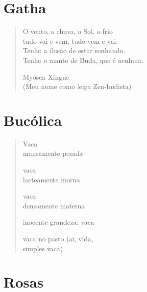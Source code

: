 \chapter{Gatha}

\begin{verse}
O vento, a chuva, o Sol, o frio\\
tudo vai e vem, tudo vem e vai.\\
Tenho a ilusão de estar sonhando.\\
Tenho o manto de Buda, que é nenhum.

Myosen Xingue\\
(Meu nome como leiga Zen-budista)
\end{verse}

\chapter{Bucólica}

\begin{verse}
Vaca\\
mansamente pesada

vaca\\
lacteamente morna

vaca\\
densamente materna

inocente grandeza: vaca

vaca no pasto (ai, vida,\\
simples vaca).
\end{verse}

\chapter{Rosas}

